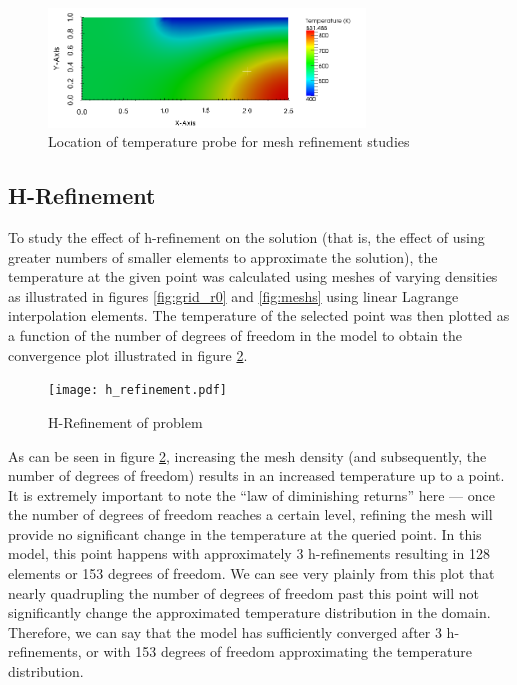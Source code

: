 \documentclass[letterpaper,10pt]{article}
\begin{document}
\begin{figure}[H]
	\centering
	\includegraphics[width=0.75\textwidth]{refinepoint.png}
	\caption{Location of temperature probe for mesh refinement studies}
	\label{fig:refinepoint}
\end{figure}

\subsection{H-Refinement}
\label{sec:h_refine}
To study the effect of h-refinement on the solution (that is, the effect of using greater numbers of smaller elements to approximate the solution), the temperature at the given point was calculated using meshes of varying densities as illustrated in figures \ref{fig:grid_r0} and \ref{fig:meshs} using linear Lagrange interpolation elements. The temperature of the selected point was then plotted as a function of the number of degrees of freedom in the model to obtain the convergence plot illustrated in figure \ref{fig:h_refinement}.

\begin{figure}[H]
	\centering
	\texttt{[image: h\_refinement.pdf]}
	\caption{H-Refinement of problem}
	\label{fig:h_refinement}
\end{figure}

As can be seen in figure \ref{fig:h_refinement}, increasing the mesh density (and subsequently, the number of degrees of freedom) results in an increased temperature up to a point. It is extremely important to note the ``law of diminishing returns'' here --- once the number of degrees of freedom reaches a certain level, refining the mesh will provide no significant change in the temperature at the queried point. In this model, this point happens with approximately 3 h-refinements resulting in 128 elements or 153 degrees of freedom. We can see very plainly from this plot that nearly quadrupling the number of degrees of freedom past this point will not significantly change the approximated temperature distribution in the domain. Therefore, we can say that the model has sufficiently converged after 3 h-refinements, or with 153 degrees of freedom approximating the temperature distribution.
\end{document}
